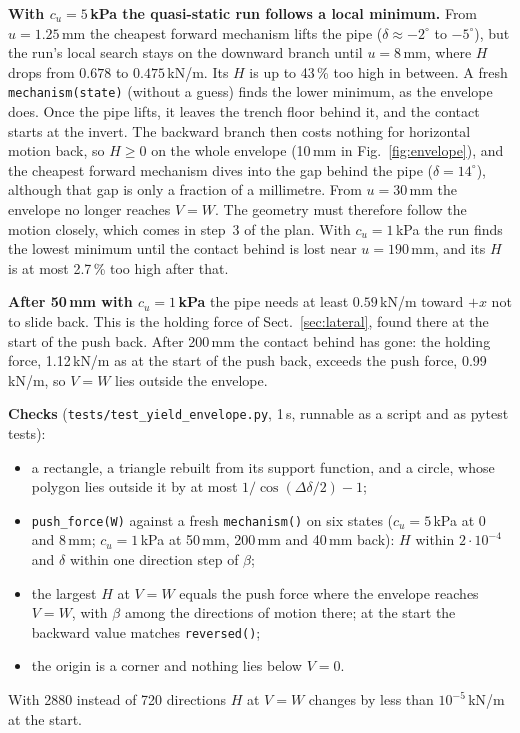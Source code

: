 \documentclass[11pt,a4paper]{article}
\begin{document}
\textbf{With $c_u = 5$\,kPa the quasi-static run follows a local
minimum.}  From $u = 1.25$\,mm the cheapest forward mechanism lifts the
pipe ($\delta \approx -2^\circ$ to $-5^\circ$), but the run's local
search stays on the downward branch until $u = 8$\,mm, where $H$ drops
from $0.678$ to $0.475$\,kN/m.  Its $H$ is up to 43\,\% too high in
between.  A fresh \texttt{mechanism(state)} (without a guess) finds the
lower minimum, as the envelope does.  Once the pipe lifts, it leaves
the trench floor behind it, and the contact starts at the invert.  The
backward branch then costs nothing for horizontal motion back, so
$H \ge 0$ on the whole envelope (10\,mm in Fig.~\ref{fig:envelope}), and
the cheapest forward mechanism dives into the gap behind the pipe
($\delta = 14^\circ$), although that gap is only a fraction of a
millimetre.  From $u = 30$\,mm the envelope no longer reaches $V = W$.
The geometry must therefore follow the motion closely, which comes in
step~3 of the plan.  With $c_u = 1$\,kPa the run finds the lowest
minimum until the contact behind is lost near $u = 190$\,mm, and its
$H$ is at most 2.7\,\% too high after that.

\textbf{After 50\,mm with $c_u = 1$\,kPa} the pipe needs at least
$0.59$\,kN/m toward $+x$ not to slide back.  This is the holding force
of Sect.~\ref{sec:lateral}, found there at the start of the push back.
After 200\,mm the contact behind has gone: the holding force,
1.12\,kN/m as at the start of the push back, exceeds the push force,
0.99\,kN/m, so $V = W$ lies outside the envelope.

\textbf{Checks} (\texttt{tests/test\_yield\_envelope.py}, 1\,s, runnable
as a script and as pytest tests):
\begin{itemize}
  \item a rectangle, a triangle rebuilt from its support function, and
    a circle, whose polygon lies outside it by at most
    $1/\cos(\Delta\delta/2) - 1$;
  \item \texttt{push\_force(W)} against a fresh \texttt{mechanism()} on
    six states ($c_u = 5$\,kPa at 0 and 8\,mm; $c_u = 1$\,kPa at
    50\,mm, 200\,mm and 40\,mm back): $H$ within $2\cdot10^{-4}$ and
    $\delta$ within one direction step of $\beta$;
  \item the largest $H$ at $V = W$ equals the push force where the
    envelope reaches $V = W$, with $\beta$ among the directions of
    motion there; at the start the backward value matches
    \texttt{reversed()};
  \item the origin is a corner and nothing lies below $V = 0$.
\end{itemize}
With 2880 instead of 720 directions $H$ at $V = W$ changes by less than
$10^{-5}$\,kN/m at the start.
\end{document}
